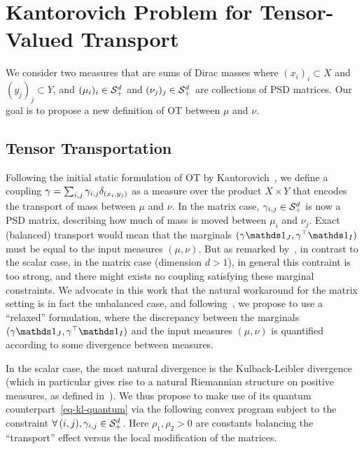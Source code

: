 
\section{Kantorovich Problem for Tensor-Valued Transport}

We consider two measures that are sums of Dirac masses
where $(x_i)_i \subset X$ and $(y_j)_j \subset Y$, and $(\mu_i)_i \in \mathcal{S}_+^d$ and $(\nu_j)_j \in \mathcal{S}_+^d$ are collections of PSD matrices. 
%
Our goal is to propose a new definition of OT between $\mu$ and $\nu$. 


\subsection{Tensor Transportation}

Following the initial static formulation of OT by Kantorovich~\cite{Kantorovich42}, we define a coupling $\gamma = \sum_{i,j}\gamma_{i,j} \delta_{(x_i,y_j)}$ as a measure over the product $X \times Y$ that encodes the transport of mass between $\mu$ and $\nu$. In the matrix case, $\gamma_{i,j} \in \mathcal{S}_+^d$ is now a PSD matrix, describing how much of mass is moved between $\mu_i$ and $\nu_j$. 
% 
Exact (balanced) transport would mean that the marginals $(\ga \ones_J,\ga^\top \ones_I)$ must be equal to the input measures $(\mu,\nu)$. But as remarked by~\cite{ning2015matrix}, in contrast to the scalar case, in the matrix case (dimension $d>1$), in general this contraint is too strong, and there might exists no coupling satisfying these marginal constraints.
%
We advocate in this work that the natural workaround for the matrix setting is in fact the unbalanced case, and following~\cite{LieroMielkeSavareLong}, we propose to use a ``relaxed'' formulation, where the discrepancy between the marginals $(\ga \ones_J,\ga^\top \ones_I)$ and the input measures $(\mu,\nu)$ is quantified according to some divergence between measures. 

In the scalar case, the most natural divergence is the Kulback-Leibler divergence (which in particular gives rise to a natural Riemannian structure on positive measures, as defined in~\cite{LieroMielkeSavareCourt,kondratyev2015,2016-chizat-focm}).  We thus propose to make use of its quantum counterpart~\eqref{eq-kl-quantum} %
%
via
  the following convex program
subject to the constraint $\forall \, (i,j), \gamma_{i,j} \in \mathcal{S}_+^d$.
Here $\rho_1,\rho_2 >0$ are constants balancing the ``transport'' effect versus the local modification of the matrices. 

